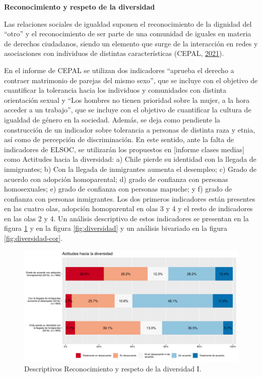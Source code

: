 \documentclass[
  12pt,
]{book}
\begin{document}
\textbf{Reconocimiento y respeto de la diversidad}

Las relaciones sociales de igualdad suponen el reconocimiento de la dignidad del ``otro'' y el reconocimiento de ser parte de una comunidad de iguales en materia de derechos ciudadanos, siendo un elemento que surge de la interacción en redes y asociaciones con individuos de distintas características (CEPAL, \protect\hyperlink{ref-cepal_Cohesion_2021}{2021}).

En el informe de CEPAL se utilizan dos indicadores ``aprueba el derecho a contraer matrimonio de parejas del mismo sexo'', que se incluye con el objetivo de cuantificar la tolerancia hacia los individuos y comunidades con distinta orientación sexual y ``Los hombres no tienen prioridad sobre la mujer, a la hora acceder a un trabajo'', que se incluye con el objetivo de cuantificar la cultura de igualdad de género en la sociedad. Además, se deja como pendiente la construcción de un indicador sobre tolerancia a personas de distinta raza y etnia, así como de percepción de discriminación. En este sentido, ante la falta de indicadores de ELSOC, se utilizarán los propuestos en {[}informe clases medias{]} como Actitudes hacia la diversidad: a) Chile pierde su identidad con la llegada de inmigrantes; b) Con la llegada de inmigrantes aumenta el desempleo; c) Grado de acuerdo con adopción homoparental; d) grado de confianza con personas homosexuales; e) grado de confianza con personas mapuche; y f) grado de confianza con personas inmigrantes. Los dos primeros indicadores están presentes en las cuatro olas, adopción homoparental en olas 3 y 4 y el resto de indicadores en las olas 2 y 4. Un análisis descriptivo de estos indicadores se presentan en la figura \ref{fig:prejuicios} y en la figura \ref{fig:diversidad} y un análisis bivariado en la figura \ref{fig:diversidad-cor}.

\begin{figure}[H]

{\centering \includegraphics[width=1\linewidth,height=1\textheight]{output/graphs/prejuicios} 

}

\caption{Descriptivos Reconocimiento y respeto de la diversidad I.}\label{fig:prejuicios}
\end{figure}
\end{document}
